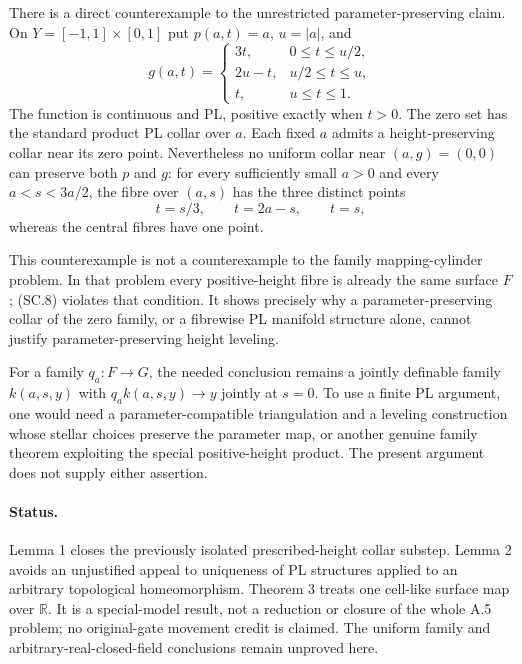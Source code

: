 There is a direct counterexample to the unrestricted parameter-preserving
claim. On $Y=[-1,1]\times[0,1]$ put $p(a,t)=a$, $u=|a|$, and
\[
 g(a,t)=
 \begin{cases}
 3t,&0\le t\le u/2,\\
 2u-t,&u/2\le t\le u,\\
 t,&u\le t\le1.
 \end{cases}
 \tag{SC.8}
\]
The function is continuous and PL, positive exactly when $t>0$. The zero
set has the standard product PL collar over $a$. Each fixed $a$ admits
a height-preserving collar near its zero point. Nevertheless no uniform
collar near $(a,g)=(0,0)$ can preserve both $p$ and $g$: for every sufficiently
small $a>0$ and every $a<s<3a/2$, the fibre over $(a,s)$ has the three
distinct points
\[
 t=s/3,\qquad t=2a-s,\qquad t=s,
\]
whereas the central fibres have one point.

This counterexample is not a counterexample to the family mapping-cylinder
problem. In that problem every positive-height fibre is already the same
surface $F$; (SC.8) violates that condition. It shows precisely why a
parameter-preserving collar of the zero family, or a fibrewise PL manifold
structure alone, cannot justify parameter-preserving height leveling.

For a family $q_a:F\to G$, the needed conclusion remains a jointly definable
family $k(a,s,y)$ with $q_a k(a,s,y)\to y$ jointly at $s=0$. To use a finite
PL argument, one would need a parameter-compatible triangulation and a
leveling construction whose stellar choices preserve the parameter map, or
another genuine family theorem exploiting the special positive-height
product. The present argument does not supply either assertion.

\paragraph{Status.}
Lemma 1 closes the previously isolated prescribed-height collar substep.
Lemma 2 avoids an unjustified appeal to uniqueness of PL structures applied
to an arbitrary topological homeomorphism. Theorem 3 treats one cell-like
surface map over $\mathbb R$. It is a special-model result, not a reduction
or closure of the whole A.5 problem; no original-gate movement credit is
claimed. The uniform family and arbitrary-real-closed-field conclusions
remain unproved here.
